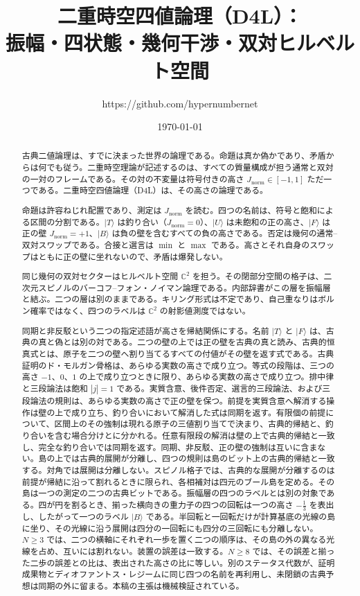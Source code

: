 \documentclass[a4paper]{article}
\title{二重時空四値論理（D4L）：\\
振幅・四状態・幾何干渉・双対ヒルベルト空間}
\author{https://github.com/hypernumbernet}
\date{\today}
\theoremstyle{definition}
\newcommand{\Jnorm}{J_{\mathrm{norm}}}
\begin{document}
\maketitle

\begin{abstract}
古典二値論理は、すでに決まった世界の論理である。命題は真か偽かであり、矛盾からは何でも従う。二重時空理論が記述するのは、すべての質量構成が担う通常と双対の一対のフレームである。その対の不変量は符号付きの高さ \(\Jnorm\in[-1,1]\) ただ一つである。二重時空四値論理（D4L）は、その高さの論理である。

命題は許容ねじれ配置であり、測定は \(\Jnorm\) を読む。四つの名前は、符号と飽和による区間の分割である。\(\lvert T\rangle\) は釣り合い（\(\Jnorm=0\)）、\(\lvert U\rangle\) は未飽和の正の高さ、\(\lvert F\rangle\) は正の壁 \(\Jnorm=+1\)、\(\lvert B\rangle\) は負の壁を含むすべての負の高さである。否定は幾何の通常–双対スワップである。合接と選言は \(\min\) と \(\max\) である。高さとそれ自身のスワップはともに正の壁に坐れないので、矛盾は爆発しない。

同じ幾何の双対セクターはヒルベルト空間 \(\mathbb{C}^2\) を担う。その閉部分空間の格子は、二次元スピノルのバーコフ--フォン・ノイマン論理である。内部辞書がこの層を振幅層と結ぶ。二つの層は別のままである。キリング形式は不定であり、自己重なりはボルン確率ではなく、四つのラベルは \(\mathbb{C}^2\) の射影値測度ではない。

同期と非反駁という二つの指定述語が高さを帰結関係にする。名前 \(\lvert T\rangle\) と \(\lvert F\rangle\) は、古典の真と偽とは別の対である。二つの壁の上では正の壁を古典の真と読み、古典的恒真式とは、原子を二つの壁へ割り当てるすべての付値がその壁を返す式である。古典証明のド・モルガン骨格は、あらゆる実数の高さで成り立つ。等式の段階は、三つの高さ \(-1\)、\(0\)、\(1\) の上で成り立つときに限り、あらゆる実数の高さで成り立つ。排中律と三段論法は飽和 \(|j|=1\) である。実質含意、後件否定、選言的三段論法、および三段論法の規則は、あらゆる実数の高さで正の壁を保つ。前提を実質含意へ解消する操作は壁の上で成り立ち、釣り合いにおいて解消した式は同期を返す。有限個の前提について、区間上のその強制は現れる原子の三値割り当てで決まり、古典的帰結と、釣り合いを含む場合分けとに分かれる。任意有限段の解消は壁の上で古典的帰結と一致し、完全な釣り合いでは同期を返す。同期、非反駁、正の壁の強制は互いに含まない。島の上では古典的展開が分離し、四つの規則は島のビット上の古典的帰結と一致する。対角では展開は分離しない。スピノル格子では、古典的な展開が分離するのは前提が帰結に沿って割れるときに限られ、各相補対は四元のブール島を定める。その島は一つの測定の二つの古典ビットである。振幅層の四つのラベルとは別の対象である。四が円を割るとき、揃った横向きの重力子の四つの回転は一つの高さ \(-\frac13\) を表出し、したがって一つのラベル \(\lvert B\rangle\) である。半回転と一回転だけが計算基底の光線の島に坐り、その光線に沿う展開は四分の一回転にも四分の三回転にも分離しない。\(N\ge 3\) では、二つの横軸にそれぞれ一歩を置く二つの順序は、その島の外の異なる光線を占め、互いには割れない。装置の誤差は一致する。\(N\ge 8\) では、その誤差と揃った二歩の誤差との比は、表出された高さの比に等しい。別のステータス代数が、証明成果物とディオファントス・レジームに同じ四つの名前を再利用し、未閉鎖の古典予想は同期の外に留まる。本稿の主張は機械検証されている。
\end{abstract}
\end{document}

